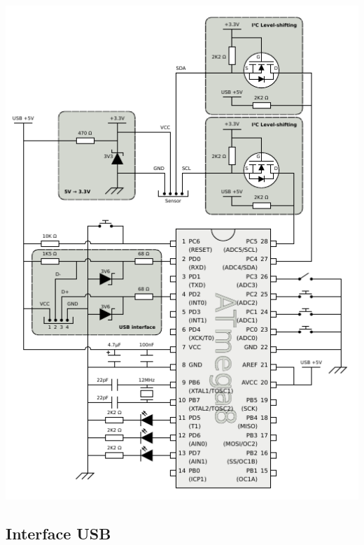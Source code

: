 \documentclass{beamer}
\begin{document}
\begin{frame}[plain, label=circuito-landscape]
	\begin{center}
		\includegraphics[angle=90, keepaspectratio, width=1.0\textwidth, height=1.0\textheight, clip, trim=0.00in 0.10in 0.00in 0.10in]{../monografia/img/AVR-magnetometer-usb-mouse.pdf}
	\end{center}
\end{frame}


\subsection{Interface USB}
\end{document}
